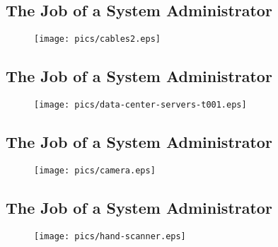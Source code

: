 \documentclass[xga]{xdvislides}
\begin{document}
\subsection{The Job of a System Administrator}
\vspace*{\fill}
\begin{figure}[hb]
	\begin{center}
		\texttt{[image: pics/cables2.eps]} \\
	\end{center}
\end{figure}
\vspace*{\fill}

\subsection{The Job of a System Administrator}
\vspace*{\fill}
\begin{figure}[hb]
	\begin{center}
		\texttt{[image: pics/data-center-servers-t001.eps]} \\
	\end{center}
\end{figure}
\vspace*{\fill}

\subsection{The Job of a System Administrator}
\vspace*{\fill}
\begin{figure}[hb]
	\begin{center}
		\texttt{[image: pics/camera.eps]} \\
	\end{center}
\end{figure}
\vspace*{\fill}

\subsection{The Job of a System Administrator}
\vspace*{\fill}
\begin{figure}[hb]
	\begin{center}
		\texttt{[image: pics/hand-scanner.eps]} \\
	\end{center}
\end{figure}
\vspace*{\fill}
\end{document}
